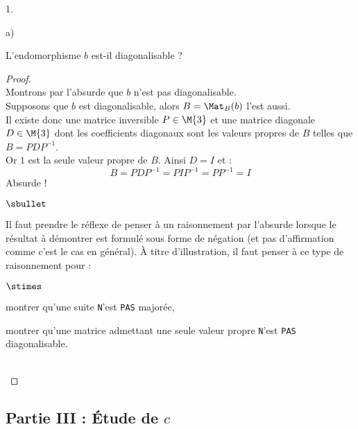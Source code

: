 \begin{noliste}{1.}
\begin{noliste}{a)}
  \item L'endomorphisme $b$ est-il diagonalisable ?
    
    \begin{proof}~\\
      Montrons par l'absurde que $b$ n'est pas diagonalisable.\\
      Supposons que $b$ est diagonalisable, alors $B = \Mat_{B}(b)$
      l'est aussi.\\
      Il existe donc une matrice inversible $P \in \M{3}$ et une
      matrice diagonale $D \in \M{3}$ dont les coefficients diagonaux
      sont les valeurs propres de $B$ telles que $B = PDP^{-1}$.\\
      Or $1$ est la seule valeur propre de $B$. Ainsi $D = I$ et :
      \[
      B = PDP^{-1} = PIP^{-1} = PP^{-1} = I
      \]
      Absurde !%
      \begin{remarkL}{.95}
        \begin{noliste}{$\sbullet$}        
        \item Il faut prendre le réflexe de penser à un raisonnement par
          l'absurde lorsque le résultat à démontrer est formulé sous forme
          de négation (et pas d'affirmation comme c'est le cas en
          général). À titre d'illustration, il faut penser à ce type de
          raisonnement pour :
          \begin{noliste}{$\stimes$}
          \item montrer qu'une suite {\tt N}'est {\tt PAS} majorée,
          \item montrer qu'une matrice admettant une seule valeur propre
            {\tt N}'est {\tt PAS} diagonalisable.
          \end{noliste}
        \end{noliste}
      \end{remarkL}~\\[-1.4cm]
    \end{proof}
  \end{noliste}
\end{noliste}

\subsection*{Partie III : Étude de $c$}


